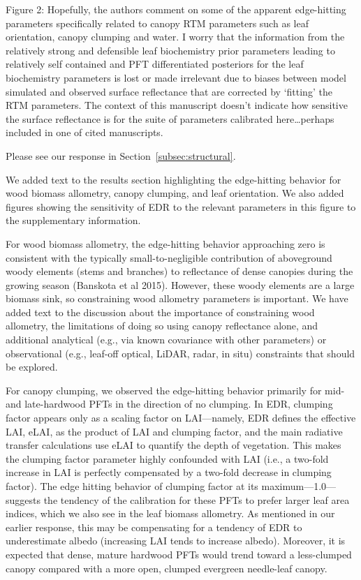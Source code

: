 \begin{reviewer}
  Figure 2: Hopefully, the authors comment on some of the apparent edge-hitting parameters specifically related to canopy RTM parameters such as leaf orientation, canopy clumping and water.
  I worry that the information from the relatively strong and defensible leaf biochemistry prior parameters leading to relatively self contained and PFT differentiated posteriors for the leaf biochemistry parameters is lost or made irrelevant due to biases between model simulated and observed surface reflectance that are corrected by ‘fitting’ the RTM parameters.
  The context of this manuscript doesn’t indicate how sensitive the surface reflectance is for the suite of parameters calibrated here\ldots perhaps included in one of cited manuscripts.
\end{reviewer}

Please see our response in Section~\ref{subsec:structural}.

We added text to the results section highlighting the edge-hitting behavior for wood biomass allometry, canopy clumping, and leaf orientation. We also added figures showing the sensitivity of EDR to the relevant parameters in this figure to the supplementary information.

For wood biomass allometry, the edge-hitting behavior approaching zero is consistent with the typically small-to-negligible contribution of aboveground woody elements (stems and branches) to reflectance of dense canopies during the growing season (Banskota et al 2015). However, these woody elements are a large biomass sink, so constraining wood allometry parameters is important. We have added text to the discussion about the importance of constraining wood allometry, the limitations of doing so using canopy reflectance alone, and additional analytical (e.g., via known covariance with other parameters) or observational (e.g., leaf-off optical, LiDAR, radar, in situ) constraints that should be explored.

For canopy clumping, we observed the edge-hitting behavior primarily for mid- and late-hardwood PFTs in the direction of no clumping. In EDR, clumping factor appears only as a scaling factor on LAI---namely, EDR defines the effective LAI, eLAI, as the product of LAI and clumping factor, and the main radiative transfer calculations use eLAI to quantify the depth of vegetation. This makes the clumping factor parameter highly confounded with LAI (i.e., a two-fold increase in LAI is perfectly compensated by a two-fold decrease in clumping factor). The edge hitting behavior of clumping factor at its maximum---1.0---suggests the tendency of the calibration for these PFTs to prefer larger leaf area indices, which we also see in the leaf biomass allometry. As mentioned in our earlier response, this may be compensating for a tendency of EDR to underestimate albedo (increasing LAI tends to increase albedo). Moreover, it is expected that dense, mature hardwood PFTs would trend toward a less-clumped canopy compared with a more open, clumped evergreen needle-leaf canopy.

